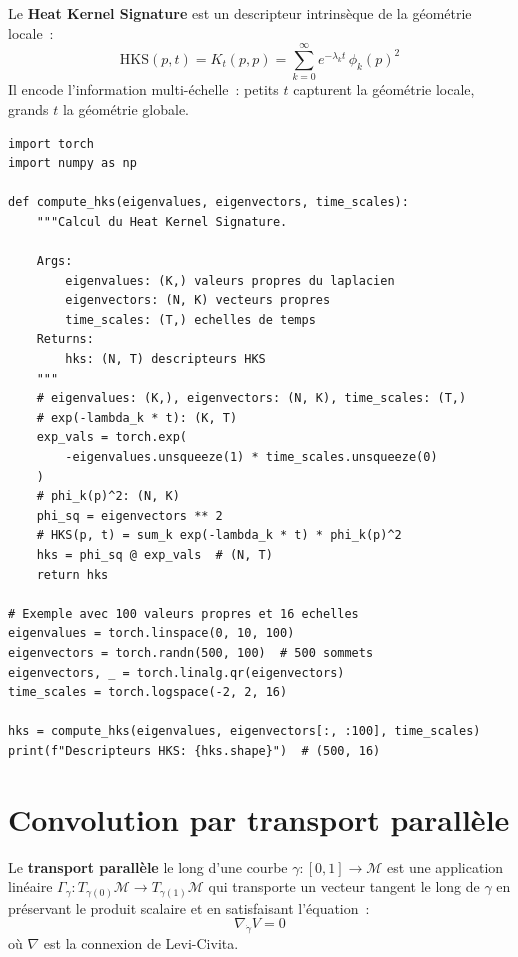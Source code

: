 \begin{definition}
Le \textbf{Heat Kernel Signature} est un descripteur intrins\`eque de la
g\'eom\'etrie locale~:
\[
    \mathrm{HKS}(p, t) = K_t(p, p) = \sum_{k=0}^{\infty} e^{-\lambda_k t}\, \phi_k(p)^2
\]
Il encode l'information multi-\'echelle~: petits $t$ capturent la g\'eom\'etrie
locale, grands $t$ la g\'eom\'etrie globale.
\end{definition}

\begin{codeblock}[title=\textbf{Calcul du HKS sur un maillage}]
\begin{verbatim}
import torch
import numpy as np

def compute_hks(eigenvalues, eigenvectors, time_scales):
    """Calcul du Heat Kernel Signature.

    Args:
        eigenvalues: (K,) valeurs propres du laplacien
        eigenvectors: (N, K) vecteurs propres
        time_scales: (T,) echelles de temps
    Returns:
        hks: (N, T) descripteurs HKS
    """
    # eigenvalues: (K,), eigenvectors: (N, K), time_scales: (T,)
    # exp(-lambda_k * t): (K, T)
    exp_vals = torch.exp(
        -eigenvalues.unsqueeze(1) * time_scales.unsqueeze(0)
    )
    # phi_k(p)^2: (N, K)
    phi_sq = eigenvectors ** 2
    # HKS(p, t) = sum_k exp(-lambda_k * t) * phi_k(p)^2
    hks = phi_sq @ exp_vals  # (N, T)
    return hks

# Exemple avec 100 valeurs propres et 16 echelles
eigenvalues = torch.linspace(0, 10, 100)
eigenvectors = torch.randn(500, 100)  # 500 sommets
eigenvectors, _ = torch.linalg.qr(eigenvectors)
time_scales = torch.logspace(-2, 2, 16)

hks = compute_hks(eigenvalues, eigenvectors[:, :100], time_scales)
print(f"Descripteurs HKS: {hks.shape}")  # (500, 16)
\end{verbatim}
\end{codeblock}

\section{Convolution par transport parall\`ele}

\begin{definition}
Le \textbf{transport parall\`ele} le long d'une courbe $\gamma: [0,1] \to \mathcal{M}$
est une application lin\'eaire $\Gamma_\gamma: T_{\gamma(0)}\mathcal{M} \to
T_{\gamma(1)}\mathcal{M}$ qui transporte un vecteur tangent le long de $\gamma$
en pr\'eservant le produit scalaire et en satisfaisant l'\'equation~:
\[
    \nabla_{\dot{\gamma}} V = 0
\]
o\`u $\nabla$ est la connexion de Levi-Civita.
\end{definition}

